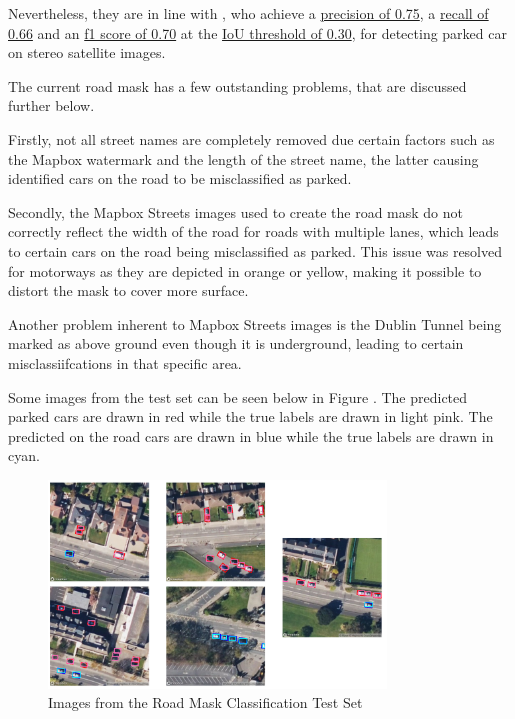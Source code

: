 Nevertheless, they are in line with \cite{similarresults}, who achieve a
\underline{precision of 0.75}, a \underline{recall of 0.66} and an \underline{f1
  score of 0.70} at the \underline{IoU threshold of 0.30}, for detecting parked
car on stereo satellite images.

The current road mask has a few outstanding problems, that are discussed further
below.

Firstly, not all street names are completely removed due certain factors such as
the Mapbox watermark and the length of the street name, the latter causing
identified cars on the road to be misclassified as parked.

Secondly, the Mapbox Streets images used to create the road mask do not
correctly reflect the width of the road for roads with multiple lanes, which
leads to certain cars on the road being misclassified as parked. This issue was
resolved for motorways as they are depicted in orange or yellow, making
it possible to distort the mask to cover more surface.

Another problem inherent to Mapbox Streets images is the Dublin Tunnel being
marked as above ground even though it is underground, leading to certain
misclassiifcations in that specific area.

Some images from the test set can be seen below in
Figure . The predicted parked cars are drawn in red while
the true labels are drawn in light pink. The predicted on the road cars are
drawn in blue while the true labels are drawn in cyan.

\begin{figure}[htbp]
  \centering
  \includegraphics[width=0.8\textwidth]{images/road-mask-classification-test.png}
  \caption{Images from the Road Mask Classification Test Set}
  \label{tab:test_images1}
\end{figure}

\newpage{}

